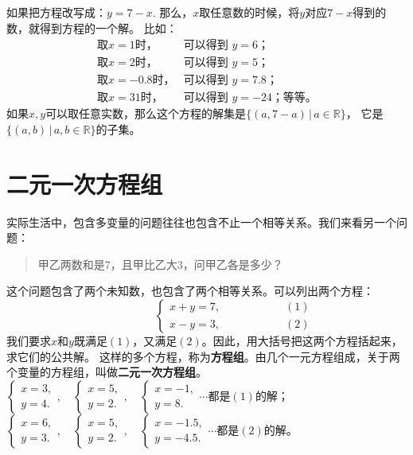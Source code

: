 \documentclass[12pt,UTF8]{ctexbook}
\begin{document}
如果把方程改写成：$ y = 7 - x.$
那么，$x$取任意数的时候，将$y$对应$7 - x$得到的数，就得到方程的一个解。
比如：
$$
\begin{array}{ll}
    \mbox{取}x = 1\mbox{时，} & \mbox{可以得到 }y = 6\mbox{；} \\
    \mbox{取}x = 2\mbox{时，} & \mbox{可以得到 }y = 5\mbox{；}  \\
    \mbox{取}x = -0.8\mbox{时，} & \mbox{可以得到 }y = 7.8\mbox{；}  \\
    \mbox{取}x = 31\mbox{时，} & \mbox{可以得到 }y = -24\mbox{；等等。} 
\end{array}
$$
如果$x,y$可以取任意实数，那么这个方程的解集是$\{(a, 7-a) \,|\, a \in \mathbb{R}\}$，
它是$\{(a, b) \,|\, a,b\in\mathbb{R}\}$的子集。

\section{二元一次方程组}
实际生活中，包含多变量的问题往往也包含不止一个相等关系。我们来看另一个问题：
\begin{quote}
    甲乙两数和是$7$，且甲比乙大$3$，问甲乙各是多少？
\end{quote}
这个问题包含了两个未知数，也包含了两个相等关系。可以列出两个方程：
$$ \quad \quad \quad \quad \quad\left\{
\begin{array}{cr}
     x + y = 7, & \quad \quad \quad \quad \quad (1) \\
     x - y = 3, & \quad \quad \quad \quad \quad (2)
\end{array}\right.
$$
我们要求$x$和$y$既满足$(1)$，又满足$(2)$。因此，用大括号把这两个方程括起来，求它们的公共解。
这样的多个方程，称为\textbf{方程组}。由几个一元方程组成，关于两个变量的方程组，叫做\textbf{二元一次方程组}。\\
$ \left\{ \begin{array}{c}
    x = 3, \\
    y = 4.
\end{array}\right. ,\quad \left\{ \begin{array}{c}
    x = 5, \\
    y = 2.
\end{array}\right. ,\quad \left\{ \begin{array}{c}
    x = -1, \\
    y = 8.
\end{array}\right.\cdots $都是$(1)$的解；\\
$ \left\{ \begin{array}{c}
    x = 6, \\
    y = 3.
\end{array}\right. ,\quad \left\{ \begin{array}{c}
    x = 5, \\
    y = 2.
\end{array}\right. ,\quad \left\{ \begin{array}{c}
    x = -1.5, \\
    y = -4.5.
\end{array}\right.\cdots $都是$(2)$的解。\\
\end{document}

